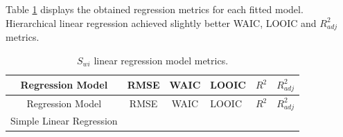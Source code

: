 \documentclass[english,msc,numbers]{coppe}
\begin{document}
  Table \ref{tab:swi-regression-metrics} displays the obtained regression metrics for each fitted model. Hierarchical linear regression achieved slightly better WAIC, LOOIC and \(R_{adj}^2\) metrics.
  \begin{longtable}[]{@{}ccclll@{}}
  \caption{\label{tab:swi-regression-metrics} \(S_{wi}\) linear regression model metrics.}\tabularnewline
  \toprule
  \begin{minipage}[b]{0.36\columnwidth}\centering
  Regression Model\strut
  \end{minipage} & \begin{minipage}[b]{0.08\columnwidth}\centering
  RMSE\strut
  \end{minipage} & \begin{minipage}[b]{0.11\columnwidth}\centering
  WAIC\strut
  \end{minipage} & \begin{minipage}[b]{0.09\columnwidth}\raggedright
  LOOIC\strut
  \end{minipage} & \begin{minipage}[b]{0.06\columnwidth}\raggedright
  \(R^2\)\strut
  \end{minipage} & \begin{minipage}[b]{0.13\columnwidth}\raggedright
  \(R_{adj}^2\)\strut
  \end{minipage}\tabularnewline
  \midrule
  \endfirsthead
  \toprule
  \begin{minipage}[b]{0.36\columnwidth}\centering
  Regression Model\strut
  \end{minipage} & \begin{minipage}[b]{0.08\columnwidth}\centering
  RMSE\strut
  \end{minipage} & \begin{minipage}[b]{0.11\columnwidth}\centering
  WAIC\strut
  \end{minipage} & \begin{minipage}[b]{0.09\columnwidth}\raggedright
  LOOIC\strut
  \end{minipage} & \begin{minipage}[b]{0.06\columnwidth}\raggedright
  \(R^2\)\strut
  \end{minipage} & \begin{minipage}[b]{0.13\columnwidth}\raggedright
  \(R_{adj}^2\)\strut
  \end{minipage}\tabularnewline
  \midrule
  \endhead
  \begin{minipage}[t]{0.36\columnwidth}\centering
  Simple Linear Regression\strut
  \end{minipage} & \begin{minipage}[t]{0.08\columnwidth}\centering

\end{minipage}
\end{longtable}
\end{document}
